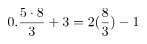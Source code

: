 \documentclass[preview]{standalone}
\begin{document}
\begin{align*}
\special{dvisvgm:raw <g id='unique000'>}0.\frac{5 \cdot 8}{3} + 3 = 2(\frac{8}{3}) - 1\special{dvisvgm:raw </g>}
\end{align*}
\end{document}
